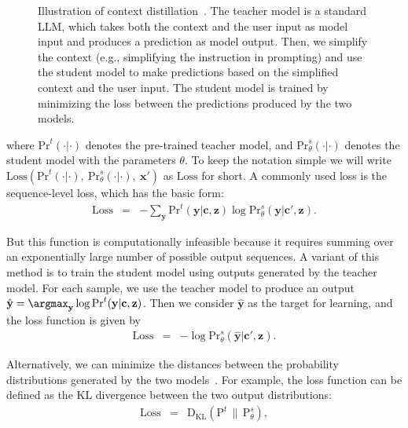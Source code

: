 \begin{figure}[!t]
\centering

\caption{Illustration of context distillation~\cite{snell-etal:2022learning}. The teacher model is a standard LLM, which takes both the context and the user input as model input and produces a prediction as model output. Then, we simplify the context (e.g., simplifying the instruction in prompting) and use the student model to make predictions based on the simplified context and the user input. The student model is trained by minimizing the loss between the predictions produced by the two models.}
\label{fig:context-distillation}
\end{figure}

\noindent where $\mathrm{Pr}^{t}(\cdot|\cdot)$ denotes the pre-trained teacher model, and $\mathrm{Pr}_{\theta}^{s}(\cdot|\cdot)$ denotes the student model with the parameters $\theta$. To keep the notation simple we will write $\mathrm{Loss}(\mathrm{Pr}^{t}(\cdot|\cdot),\ \mathrm{Pr}_{\theta}^{s}(\cdot|\cdot),\ \mathbf{x}')$ as $\mathrm{Loss}$ for short. A commonly used loss is the sequence-level loss, which has the basic form:
\begin{eqnarray}
\mathrm{Loss} & = & -\sum_{\mathbf{y}} \mathrm{Pr}^{t}(\mathbf{y}|\mathbf{c},\mathbf{z}) \log \mathrm{Pr}_{\theta}^{s}(\mathbf{y}|\mathbf{c}',\mathbf{z}).
\end{eqnarray}

But this function is computationally infeasible because it requires summing over an exponentially large number of possible output sequences. A variant of this method is to train the student model using outputs generated by the teacher model. For each sample, we use the teacher model to produce an output $\hat{\mathbf{y}} = \argmax_{\mathbf{y}} \log \mathrm{Pr}^{t}(\mathbf{y}|\mathbf{c},\mathbf{z})$. Then we consider $\hat{\mathbf{y}}$ as the target for learning, and the loss function is given by
\begin{eqnarray}
\mathrm{Loss} & = & -\log \mathrm{Pr}_{\theta}^{s}(\hat{\mathbf{y}}|\mathbf{c}', \mathbf{z}). \label{eq:context-distillation-simple}
\end{eqnarray}

Alternatively, we can minimize the distances between the probability distributions generated by the two models~\cite{askell-etal:2021general}. For example, the loss function can be defined as the KL divergence between the two output distributions:
\begin{eqnarray}
\mathrm{Loss} & = & \mathrm{D}_{\mathrm{KL}}(\mathrm{P}^{t} \,\|\, \mathrm{P}_{\theta}^{s}), \label{eq:context-distillation-kl}
\end{eqnarray}

